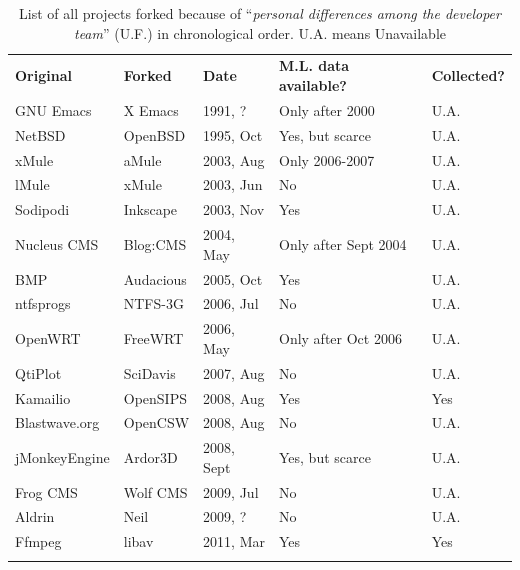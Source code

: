 \documentclass[11pt]{report}
\begin{document}
\begin{table}
\centering
\caption[List of all projects forked because of ``\textit{personal differences among the developer team}'' (U.F.)]{List of all projects forked because of ``\textit{personal differences among the developer team}'' (U.F.) \cite{Robles} in chronological order. U.A. means Unavailable}
\label{tabelProjectsForkedCat1PersonalDiffereces}       
\begin{tabular}{m{} m{} m{} m{} m{}}
\hline\noalign{\smallskip}
\textbf{Original} & \textbf{Forked} & \textbf{Date} & \textbf{M.L. data available?} & \textbf{Collected?}\\
\noalign{\smallskip}\hline\noalign{\smallskip}
GNU Emacs & X Emacs & 1991, ? & Only after 2000 & U.A. \\ \hline
NetBSD & OpenBSD & 1995, Oct & Yes, but scarce & U.A. \\ \hline
xMule & aMule & 2003, Aug & Only 2006-2007 & U.A. \\ \hline
lMule & xMule & 2003, Jun & No & U.A. \\ \hline
Sodipodi & Inkscape & 2003, Nov & Yes & U.A.\\ \hline
Nucleus CMS & Blog:CMS & 2004, May & Only after Sept 2004 & U.A. \\ \hline
BMP & Audacious & 2005, Oct & Yes & U.A. \\ \hline
ntfsprogs & NTFS-3G & 2006, Jul & No & U.A. \\ \hline
OpenWRT & FreeWRT & 2006, May & Only after Oct 2006 & U.A. \\ \hline
QtiPlot & SciDavis & 2007, Aug & No & U.A. \\ \hline
Kamailio & OpenSIPS & 2008, Aug & Yes & Yes \\ \hline
Blastwave.org & OpenCSW & 2008, Aug & No & U.A. \\ \hline
jMonkeyEngine & Ardor3D & 2008, Sept & Yes, but scarce & U.A. \\ \hline
Frog CMS & Wolf CMS & 2009, Jul & No & U.A. \\ \hline
Aldrin & Neil & 2009, ? & No & U.A. \\ \hline
Ffmpeg & libav & 2011, Mar & Yes & Yes\\
\noalign{\smallskip}\hline
\end{tabular}
\end{table}
\end{document}
